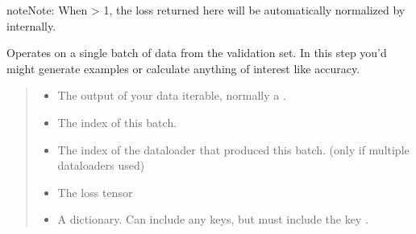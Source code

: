 \documentclass[letterpaper,10pt,english]{sphinxmanual}
\begin{document}
\begin{fulllineitems}
\begin{fulllineitems}
\begin{sphinxadmonition}{note}{Note:}
\sphinxAtStartPar
When  \textgreater{} 1, the loss returned here will be automatically
normalized by  internally.
\end{sphinxadmonition}

\end{fulllineitems}


\begin{fulllineitems}
\label{\detokenize{train:train.PcrCNN.validation_step}}
\pysigstartsignatures
\pysiglinewithargsret
{}
{\sphinxparamcomma {}}
{}
\pysigstopsignatures
\sphinxAtStartPar
Operates on a single batch of data from the validation set. In this step you’d might generate examples or
calculate anything of interest like accuracy.
\begin{quote}\begin{description}
\begin{itemize}
\item {} 
\sphinxAtStartPar
{} \textendash{} The output of your data iterable, normally a .

\item {} 
\sphinxAtStartPar
{} \textendash{} The index of this batch.

\item {} 
\sphinxAtStartPar
{} \textendash{} The index of the dataloader that produced this batch.
(only if multiple dataloaders used)

\end{itemize}

\sphinxAtStartPar
\begin{itemize}
\item {} 
\sphinxAtStartPar
{} \sphinxhyphen{} The loss tensor

\item {} 
\sphinxAtStartPar
{} \sphinxhyphen{} A dictionary. Can include any keys, but must include the key .


\end{itemize}
\end{description}
\end{quote}
\end{fulllineitems}
\end{fulllineitems}
\end{document}
